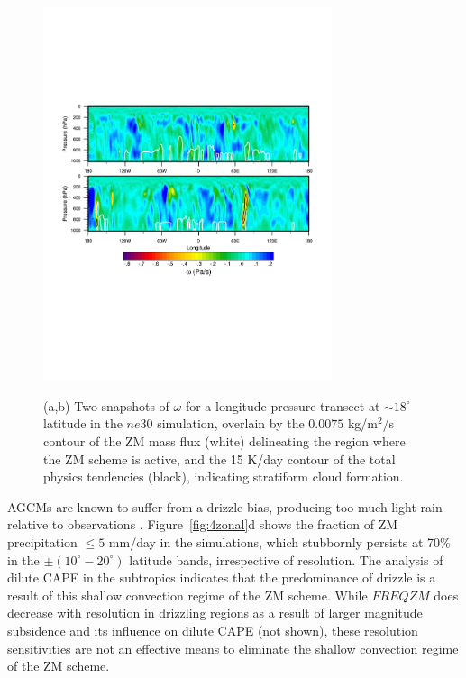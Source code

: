 \documentclass[times]{qjrms4}
\begin{document}
\begin{figure}
\begin{center}
\noindent\includegraphics[width=20pc,angle=0]{figs/temp_trans.pdf}\\
\end{center}
\caption{(a,b) Two snapshots of $\omega$ for a longitude-pressure transect at $\sim 18^{\circ}$ latitude in the $ne30$ simulation, overlain by the $0.0075$ kg/m$^2$/s contour of the ZM mass flux (white) delineating the region where the ZM scheme is active, and the 15 K/day contour of the total physics tendencies (black), indicating stratiform cloud formation.}
\label{fig:transect}
\end{figure}

AGCMs are known to suffer from a drizzle bias, producing too much light rain relative to observations \citep{D2006JCLIM}. Figure~\ref{fig:4zonal}d shows the fraction of ZM precipitation $\leq 5$ mm/day in the simulations, which stubbornly persists at 70\% in the $\pm \left(10^{\circ}-20^{\circ} \right)$ latitude bands, irrespective of resolution. The analysis of dilute CAPE in the subtropics indicates that the predominance of drizzle is a result of this shallow convection regime of the ZM scheme. While $FREQZM$ does decrease with resolution in drizzling regions as a result of larger magnitude subsidence and its influence on dilute CAPE (not shown), these resolution sensitivities are not an effective means to eliminate the shallow convection regime of the ZM scheme.
\end{document}
